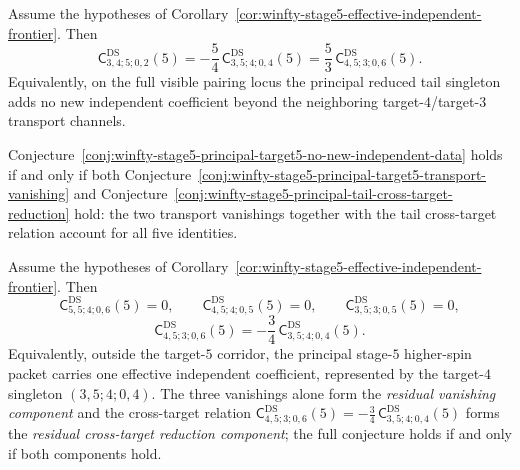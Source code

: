 \begin{conjecture}
\label{conj:winfty-stage5-principal-tail-cross-target-reduction}
\ClaimStatusConjectured{}
Assume the hypotheses of
Corollary~\ref{cor:winfty-stage5-effective-independent-frontier}.  Then
\[
\mathsf{C}^{\mathrm{DS}}_{3,4;5;0,2}(5)
=
-\frac{5}{4}\,\mathsf{C}^{\mathrm{DS}}_{3,5;4;0,4}(5)
=
\frac{5}{3}\,\mathsf{C}^{\mathrm{DS}}_{4,5;3;0,6}(5).
\]
Equivalently, on the full visible pairing locus the principal reduced
tail singleton adds no new independent coefficient beyond the
neighboring target-$4$/target-$3$ transport channels.
\end{conjecture}

\begin{remark}
\label{prop:winfty-stage5-principal-target5-factorization}%
Conjecture~\ref{conj:winfty-stage5-principal-target5-no-new-independent-data}
holds if and only if both
Conjecture~\ref{conj:winfty-stage5-principal-target5-transport-vanishing}
and
Conjecture~\ref{conj:winfty-stage5-principal-tail-cross-target-reduction}
hold: the two transport vanishings together with the tail cross-target relation account for all five identities.
\end{remark}

\begin{conjecture}
\label{conj:winfty-stage5-principal-residual-front-one-coefficient}%
\label{conj:winfty-stage5-principal-residual-front-vanishings}%
\label{conj:winfty-stage5-principal-residual-cross-target-reduction}%
\label{prop:winfty-stage5-principal-residual-front-factorization}%
\ClaimStatusConjectured{}
Assume the hypotheses of
Corollary~\ref{cor:winfty-stage5-effective-independent-frontier}.  Then
\[
\mathsf{C}^{\mathrm{DS}}_{5,5;4;0,6}(5)=0,
\qquad
\mathsf{C}^{\mathrm{DS}}_{4,5;4;0,5}(5)=0,
\qquad
\mathsf{C}^{\mathrm{DS}}_{3,5;3;0,5}(5)=0,
\]
\[
\mathsf{C}^{\mathrm{DS}}_{4,5;3;0,6}(5)
=
-\frac{3}{4}\,\mathsf{C}^{\mathrm{DS}}_{3,5;4;0,4}(5).
\]
Equivalently, outside the target-$5$ corridor, the principal stage-$5$
higher-spin packet carries one effective independent coefficient,
represented by the target-$4$ singleton \((3,5;4;0,4)\).
The three vanishings alone form the \emph{residual vanishing component}
and the cross-target relation
$\mathsf{C}^{\mathrm{DS}}_{4,5;3;0,6}(5)=-\tfrac{3}{4}\,\mathsf{C}^{\mathrm{DS}}_{3,5;4;0,4}(5)$
forms the \emph{residual cross-target reduction component};
the full conjecture holds if and only if both components hold.
\end{conjecture}

